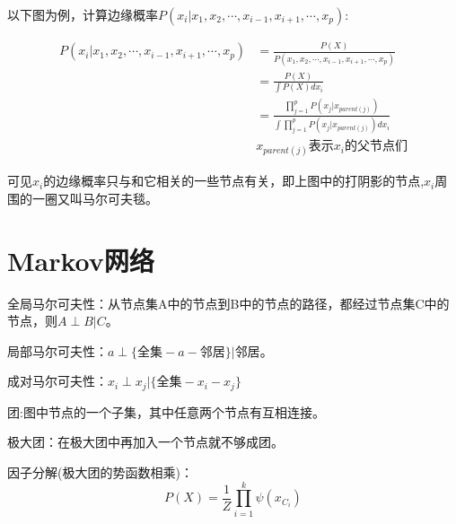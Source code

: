 \documentclass[UTF8]{ctexart} %
\begin{document}
			以下图为例，计算边缘概率$P(x_i|x_1,x_2,\cdots,x_{i-1},x_{i+1},\cdots, x_p)$:
			\begin{figure}[H]
			\end{figure}
			\[\begin{aligned}
			P(x_i|x_1,x_2,\cdots,x_{i-1},x_{i+1},\cdots, x_p) &= \frac{P(X)}{P(x_1,x_2,\cdots,x_{i-1},x_{i+1},\cdots, x_p)}\\
			&=\frac{P(X)}{\int P(X)dx_i}\\
			&=\frac{\prod_{j=1}^pP(x_j|x_{parent(j)})}{\int \prod_{j=1}^pP(x_j|x_{parent(j)})dx_i}\\
			&x_{parent(j)}\text{表示}x_i\text{的父节点们}
			\end{aligned}\]			
			
			可见$x_i$的边缘概率只与和它相关的一些节点有关，即上图中的打阴影的节点,$x_i$周围的一圈又叫马尔可夫毯。
			
			
	\section{Markov网络}	
		全局马尔可夫性：从节点集A中的节点到B中的节点的路径，都经过节点集C中的节点，则$A\perp B|C$。
		
		局部马尔可夫性：$a\perp \{\text{全集}-a-\text{邻居}\}|\text{邻居}$。
		
		成对马尔可夫性：$x_i\perp x_j|\{\text{全集}-x_i-x_j\}$ 
		
		团:图中节点的一个子集，其中任意两个节点有互相连接。
		
		极大团：在极大团中再加入一个节点就不够成团。
		
		因子分解(极大团的势函数相乘)：
		\[P(X) = \frac{1}{Z}\prod_{i=1}^k \psi(x_{C_i})\]
		
		
		
\end{document}
